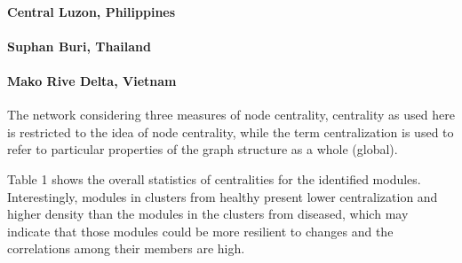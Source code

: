 \paragraph{Central Luzon, Philippines}


\paragraph{Suphan Buri, Thailand}


\paragraph{Mako Rive Delta, Vietnam}


The network considering three measures of node centrality, centrality as used here is restricted to the idea of node centrality, while the term centralization is used to refer to particular properties of the graph structure as a whole (global).

Table 1 shows the overall statistics of centralities for the identified modules. Interestingly, modules in clusters from healthy  present lower centralization and higher density than the modules in the clusters from diseased, which may indicate that those modules could be more resilient to changes and the correlations among their members are high.








